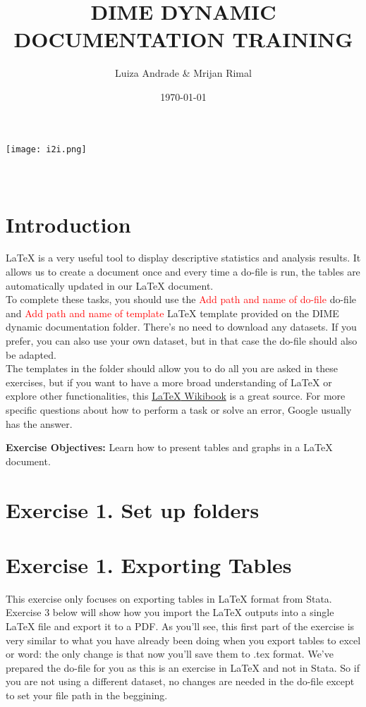 \documentclass[12pts]{report}
\title{DIME DYNAMIC DOCUMENTATION TRAINING }
\author{Luiza Andrade \& Mrijan Rimal}
\date{\today}
\begin{document}
	

\makeatletter
\begin{titlepage}
	\begin{center}
		\texttt{[image: i2i.png]}\\[10ex]
		{\LARGE \bfseries  \@title }\\[2ex] 
		{\Large  \@author}\\[20ex] 
		{\large \@date}
	\end{center}
\end{titlepage}
\makeatother

\section*{Introduction}
{\LaTeX} is a very useful tool to display descriptive statistics and analysis results. It allows us to create a document once and every time a do-file is run, the tables are automatically updated in our LaTeX document. \\

To complete these tasks, you should use the \textcolor{red}{Add path and name of do-file} do-file and \textcolor{red}{Add path and name of template} {\LaTeX} template provided on the DIME dynamic documentation folder. There's no need to download any datasets. If you prefer, you can also use your own dataset, but in that case the do-file should also be adapted. \\

The templates in the folder should allow you to do all you are asked in these exercises, but if you want to have a more broad understanding of {\LaTeX} or explore other functionalities, this \href{https://en.wikibooks.org/wiki/LaTeX
}{{\LaTeX} Wikibook} is a great source. For more specific questions about how to perform a task or solve an error, Google usually has the answer.

\textbf{Exercise Objectives:} Learn how to present tables and graphs in a {\LaTeX} document.

\section*{Exercise 1. Set up folders}

\section*{Exercise 1. Exporting Tables}
This exercise only focuses on exporting tables in {\LaTeX} format from Stata. Exercise 3 below will show how you import the LaTeX outputs into a single {\LaTeX} file and export it to a PDF. As you'll see, this first part of the exercise is very similar to what you have already been doing when you export tables to excel or word: the only change is that now you'll save them to .tex format. We've prepared the do-file for you as this is an exercise in {\LaTeX} and not in Stata. So if you are not using a different dataset, no changes are needed in the do-file except to set your file path in the beggining. \\
\end{document}

